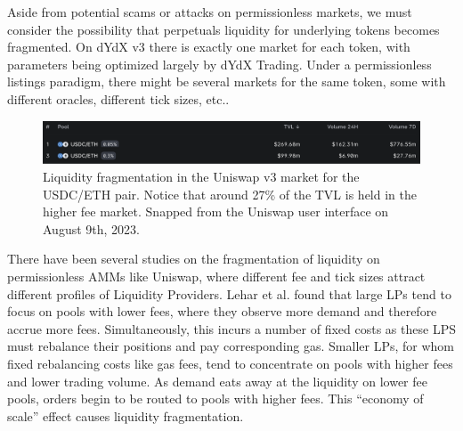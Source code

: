             Aside from potential scams or attacks on permissionless markets, we must consider the possibility that perpetuals liquidity for underlying tokens becomes fragmented. On dYdX v3 there is exactly one market for each token, with parameters being optimized largely by dYdX Trading. Under a permissionless listings paradigm, there might be several markets for the same token, some with different oracles, different tick sizes, etc.. 

            \begin{figure}[htp]
                \centering
                \includegraphics[width=\linewidth]{figs/fragmentation.png}
                \captionsetup{width=\linewidth}
                \caption{Liquidity fragmentation in the Uniswap v3 market for the USDC/ETH pair. Notice that around 27\% of the TVL is held in the higher fee market. Snapped from the Uniswap user interface on August 9th, 2023.}
                \label{fig:fragmentation}
            \end{figure}

            There have been several studies on the fragmentation of liquidity on permissionless AMMs like Uniswap, where different fee and tick sizes attract different profiles of Liquidity Providers. Lehar et al. \cite{lehar2023liquidity} found that large LPs tend to focus on pools with lower fees, where they observe more demand and therefore accrue more fees. Simultaneously, this incurs a number of fixed costs as these LPS must rebalance their positions and pay corresponding gas. Smaller LPs, for whom fixed rebalancing costs like gas fees, tend to concentrate on pools with higher fees and lower trading volume. As demand eats away at the liquidity on lower fee pools, orders begin to be routed to pools with higher fees. This ``economy of scale'' effect causes liquidity fragmentation.

